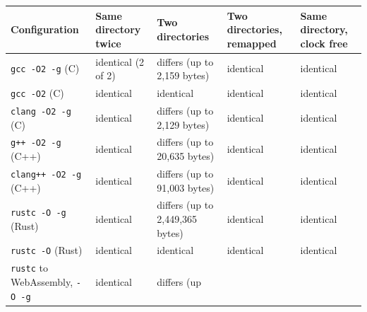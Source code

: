 \documentclass[10pt,letterpaper]{article}
\begin{document}
{\footnotesize\setlength{\tabcolsep}{3.8pt}\renewcommand{\arraystretch}{1.15}
\begin{longtable}[]{@{}
  >{\raggedright\arraybackslash}p{}
  >{\raggedright\arraybackslash}p{}
  >{\raggedright\arraybackslash}p{}
  >{\raggedright\arraybackslash}p{}
  >{\raggedright\arraybackslash}p{}@{}}
\toprule\noalign{}
\begin{minipage}[b]{\linewidth}\raggedright
\textbf{Configuration}
\end{minipage} & \begin{minipage}[b]{\linewidth}\raggedright
\textbf{Same directory twice}
\end{minipage} & \begin{minipage}[b]{\linewidth}\raggedright
\textbf{Two directories}
\end{minipage} & \begin{minipage}[b]{\linewidth}\raggedright
\textbf{Two directories, remapped}
\end{minipage} & \begin{minipage}[b]{\linewidth}\raggedright
\textbf{Same directory, clock free}
\end{minipage} \\
\midrule\noalign{}
\endhead
\bottomrule\noalign{}
\endlastfoot
\texttt{gcc\ -\allowbreak{}O2\ -\allowbreak{}g} (C) & identical (2 of 2) & differs (up to 2,159
bytes) & identical & identical \\
\texttt{gcc\ -O2} (C) & identical & identical & identical & identical \\
\texttt{clang\ -\allowbreak{}O2\ -\allowbreak{}g} (C) & identical & differs (up to 2,129 bytes) &
identical & identical \\
\texttt{g++\ -\allowbreak{}O2\ -\allowbreak{}g} (C++) & identical & differs (up to 20,635 bytes) &
identical & identical \\
\texttt{clang++\ -\allowbreak{}O2\ -\allowbreak{}g} (C++) & identical & differs (up to 91,003
bytes) & identical & identical \\
\texttt{rustc\ -\allowbreak{}O\ -\allowbreak{}g} (Rust) & identical & differs (up to 2,449,365
bytes) & identical & identical \\
\texttt{rustc\ -O} (Rust) & identical & identical & identical &
identical \\
\texttt{rustc} to WebAssembly, \texttt{-O\ -g} & identical & differs (up

\end{longtable}}
\end{document}
